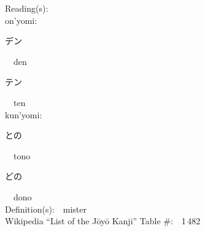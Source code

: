 \begin{multicols}{2}
Reading(s):\ \ \\
{\hspace*{1em}}on'yomi:\ \ \\
{\hspace*{2em}}{\begin{CJK}{UTF8}{min} デン \end{CJK}}\ \ den\ \ \\
{\hspace*{2em}}{\begin{CJK}{UTF8}{min} テン \end{CJK}}\ \ ten\ \ \\
{\hspace*{1em}}kun'yomi:\ \ \\
{\hspace*{2em}}{\begin{CJK}{UTF8}{min} との \end{CJK}}\ \ tono\ \ \\
{\hspace*{2em}}{\begin{CJK}{UTF8}{min} どの \end{CJK}}\ \ dono\ \ \\
Definition(s):\ \ mister \\
Wikipedia ``List of the J\=oy\=o Kanji'' Table \#:\ \ 1\,482 \\
\ \ \\
\end{multicols}



